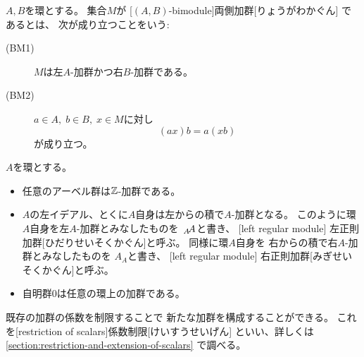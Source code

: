 \documentclass[report]{jlreq}
\begin{document}
\begin{definition}[両側加群]
    $A, B$を環とする。
    集合$M$が
    [$(A, B)$-bimodule]{両側加群}[りょうがわかぐん]
    であるとは、
    次が成り立つことをいう:
    \begin{description}
        \item[(BM1)] $M$は左$A$-加群かつ右$B$-加群である。
        \item[(BM2)] $a \in A, \; b \in B, \; x \in M$に対し
            \begin{equation}
                (ax)b = a(xb)
            \end{equation}
            が成り立つ。
    \end{description}
\end{definition}

\begin{example}[加群の例]
    $A$を環とする。
    \begin{itemize}
        \item 任意のアーベル群は$\mathbb{Z}$-加群である。
        \item $A$の左イデアル、とくに$A$自身は左からの積で$A$-加群となる。
            このように環$A$自身を左$A$-加群とみなしたものを
            $\,{}_{A}\!A$と書き、
            [left regular module]
                {左正則加群}[ひだりせいそくかぐん]と呼ぶ。
            同様に環$A$自身を
            右からの積で右$A$-加群とみなしたものを
            $A_A$と書き、
            [left regular module]
                {右正則加群}[みぎせいそくかぐん]と呼ぶ。
        \item 自明群$0$は任意の環上の加群である。
    \end{itemize}
\end{example}

既存の加群の係数を制限することで
新たな加群を構成することができる。
これを[restriction of scalars]{係数制限}[けいすうせいげん]
といい、詳しくは
\cref{section:restriction-and-extension-of-scalars}
で調べる。
\end{document}
